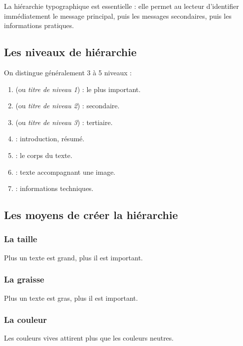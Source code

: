 La hiérarchie typographique est essentielle : elle permet au lecteur d'identifier immédiatement le message principal, puis les messages secondaires, puis les informations pratiques.

\subsection{Les niveaux de hiérarchie}

On distingue généralement 3 à 5 niveaux :

\begin{enumerate}
    \item {} (ou \emph{titre de niveau 1}) : le plus important.
    \item {} (ou \emph{titre de niveau 2}) : secondaire.
    \item {} (ou \emph{titre de niveau 3}) : tertiaire.
    \item {} : introduction, résumé.
    \item {} : le corps du texte.
    \item {} : texte accompagnant une image.
    \item {} : informations techniques.
\end{enumerate}

\subsection{Les moyens de créer la hiérarchie}

\subsubsection{La taille}

Plus un texte est grand, plus il est important.

\subsubsection{La graisse}

Plus un texte est gras, plus il est important.

\subsubsection{La couleur}

Les couleurs vives attirent plus que les couleurs neutres.

